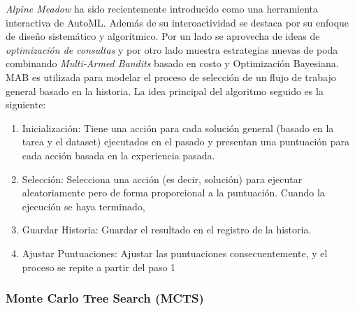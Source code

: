 \textit{Alpine Meadow} \cite{shang2019democratizing} ha sido recientemente introducido como una herramienta interactiva de AutoML. Además de su interoactividad se destaca por su enfoque de diseño sistemático y algorítmico. Por un lado se aprovecha de ideas de \textit{optimización de consultas} y por otro lado muestra estrategias nuevas de poda combinando \textit{Multi-Armed Bandits} basado en costo y Optimización Bayesiana. MAB es utilizada para modelar el proceso de selección de un flujo de trabajo general basado en la historia. La idea principal del algoritmo seguido es la siguiente:
\begin{enumerate}
	\item Inicialización: Tiene una acción para cada solución general (basado en la tarea y el dataset) ejecutados en el pasado y presentan una puntuación para cada acción basada en la experiencia pasada.
	\item Selección: Selecciona una acción (es decir, solución) para ejecutar aleatoriamente pero de forma proporcional a la puntuación. Cuando la ejecución se haya terminado,
	\item Guardar Historia: Guardar el resultado en el registro de la historia.
	\item Ajustar Puntuaciones: Ajustar las puntuaciones consecuentemente, y el proceso se repite a partir del paso 1
\end{enumerate}


\subsubsection{Monte Carlo Tree Search (MCTS)}



